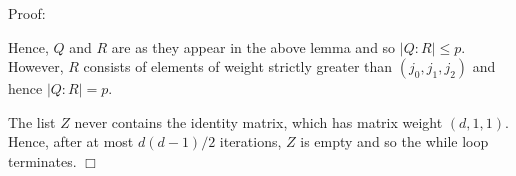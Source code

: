 \documentclass[12pt]{article}
\newenvironment{proof}{\normalsize {\sc Proof}:}{{\hfill $\Box$ \\}}
\begin{document}
\begin{proof}

Hence, $Q$ and $R$ are as they appear in the above lemma and so $|Q : R| \leq p$. However, $R$ consists of elements of weight strictly greater than $(j_0, j_1, j_2)$ and hence $|Q : R| = p$.

The list $Z$ never contains the identity matrix, which has matrix weight $(d, 1, 1)$. Hence, after at most $d(d-1)/2$ iterations, $Z$ is empty and so the while loop terminates.
\end{proof}
\end{document}
